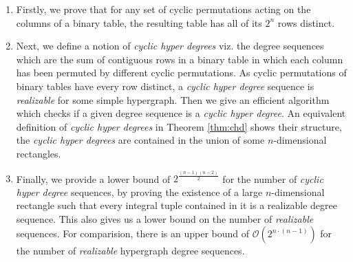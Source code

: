 \begin{enumerate}
\item
Firstly, we prove that for any set of cyclic permutations acting on the columns of a binary table, the resulting table has all of its $2^n$ rows distinct. 
\item
 Next, we define a notion of {\em cyclic hyper degrees} viz. the degree sequences which are the sum of contiguous rows in a  binary table in which each column has been permuted by different cyclic permutations. As cyclic permutations of binary tables have every row distinct, a {\em cyclic hyper degree} sequence is {\em realizable} for some simple hypergraph. Then we give an efficient algorithm which checks if a given degree sequence is a {\em cyclic hyper degree}. An equivalent definition of {\em cyclic hyper degrees} in Theorem \ref{thm:chd} shows their structure, the {\em cyclic hyper degrees} are contained in the union of some $n$-dimensional rectangles.
\item
Finally, we provide a lower bound of $2^{\frac{(n-1)(n-2)}{2}}$ for the number of {\em cyclic hyper degree} sequences, by proving the existence of a large $n$-dimensional rectangle such that every integral tuple contained in it is a realizable degree sequence. This also gives us a lower bound on the number of {\em realizable} sequences. For comparision, there is an upper bound of $\mathcal{O}(2^{n\cdot(n-1)})$ for the number of {\em realizable} hypergraph degree sequences. 
\end{enumerate}